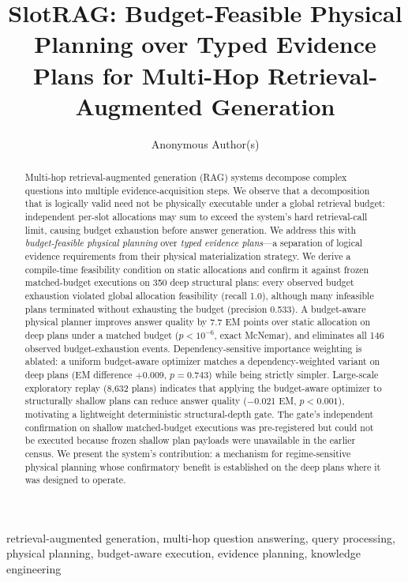 \documentclass[journal]{IEEEtran}
\title{SlotRAG: Budget-Feasible Physical Planning over Typed Evidence Plans for Multi-Hop Retrieval-Augmented Generation}
\author{%
Anonymous Author(s)
}
\begin{document}
\begin{abstract}
Multi-hop retrieval-augmented generation (RAG) systems decompose complex
questions into multiple evidence-acquisition steps. We observe that a
decomposition that is logically valid need not be physically executable under
a global retrieval budget: independent per-slot allocations may sum to
exceed the system's hard retrieval-call limit, causing budget exhaustion
before answer generation. We address this with \emph{budget-feasible
physical planning} over \emph{typed evidence plans}---a separation
of logical evidence requirements from their physical materialization
strategy. We derive a compile-time feasibility condition on static
allocations and confirm it against frozen matched-budget executions
on 350 deep structural plans: every observed budget exhaustion violated
global allocation feasibility (recall 1.0), although many infeasible plans
terminated without exhausting the budget (precision 0.533). A
budget-aware physical planner improves answer quality by 7.7 EM points
over static allocation on deep plans under a matched budget
($p < 10^{-6}$, exact McNemar), and eliminates all 146 observed
budget-exhaustion events. Dependency-sensitive importance weighting
is ablated: a uniform budget-aware optimizer matches a dependency-weighted
variant on deep plans (EM difference $+$0.009, $p = 0.743$) while
being strictly simpler. Large-scale exploratory replay (8{,}632 plans)
indicates that applying the budget-aware optimizer to structurally shallow
plans can reduce answer quality ($-$0.021 EM, $p < 0.001$), motivating
a lightweight deterministic structural-depth gate. The gate's independent
confirmation on shallow matched-budget executions was pre-registered but
could not be executed because frozen shallow plan payloads were unavailable
in the earlier census. We present the system's contribution:
a mechanism for regime-sensitive physical planning whose confirmatory
benefit is established on the deep plans where it was designed to operate.
\end{abstract}

\begin{IEEEkeywords}
retrieval-augmented generation, multi-hop question answering, query processing,
physical planning, budget-aware execution, evidence planning, knowledge engineering
\end{IEEEkeywords}

\maketitle
\end{document}
